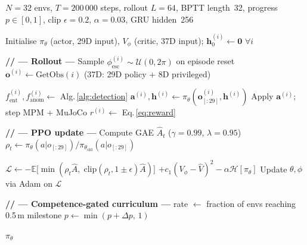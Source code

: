 \documentclass[conference]{IEEEtran}
\begin{document}
\begin{algorithm}[t]
  \caption{Curriculum PPO-GRU Training for Entrapment Recovery}
  \label{alg:training}
  \begin{algorithmic}[1]
    \Require $N{=}32$ envs, $T{=}200\,000$ steps, rollout $L{=}64$,
             BPTT length~32, progress $p{\in}[0,1]$,
             clip $\epsilon{=}0.2$, $\alpha{=}0.03$, GRU hidden~256

    \State Initialise $\pi_\theta$ (actor, 29D input),
           $V_\phi$ (critic, 37D input); $\mathbf{h}^{(i)}_0 \gets \mathbf{0}$ $\forall i$


      \State \textbf{// --- Rollout ---}
        \State Sample $\phi_\text{esc}^{(i)} \sim \mathcal{U}(0,2\pi)$
               on episode reset
        \State $\mathbf{o}^{(i)} \gets \text{GetObs}(i)$\quad
               (37D: 29D policy + 8D privileged)
 
        \State $f_\text{ent}^{(i)}, f_\text{anom}^{(i)} \gets$
               Alg.\,\ref{alg:detection}
        \State $\mathbf{a}^{(i)}, \mathbf{h}^{(i)} \gets
               \pi_\theta(\mathbf{o}^{(i)}_{[:29]}, \mathbf{h}^{(i)})$
        \State Apply $\mathbf{a}^{(i)}$; step MPM + MuJoCo
        \State $r^{(i)} \gets$ Eq.\,\eqref{eq:reward}
      \EndFor

      \State \textbf{// --- PPO update ---}
      \State Compute GAE $\hat{A}_t$ ($\gamma{=}0.99$, $\lambda{=}0.95$)
          \State $\rho_t \gets
                 \pi_\theta(a|o_{[:29]})/\pi_{\theta_\text{old}}(a|o_{[:29]})$
       
          \State $\mathcal{L} \gets
                 {-}\mathbb{E}\bigl[\min(\rho_t\hat{A},\;
                 \text{clip}(\rho_t,1{\pm}\epsilon)\hat{A})\bigr]$
                 $+ c_1(V_\phi - \hat{V})^2 - \alpha\mathcal{H}[\pi_\theta]$
          \State Update $\theta, \phi$ via Adam on $\mathcal{L}$
        \EndFor
      \EndFor

      \State \textbf{// --- Competence-gated curriculum ---}
      \State rate $\gets$ fraction of envs reaching 0.5\,m milestone
        \State $p \gets \min(p + \Delta p,\,1)$
      \EndIf

    \EndFor
    \State \Return $\pi_\theta$
  \end{algorithmic}
\end{algorithm}
\end{document}
